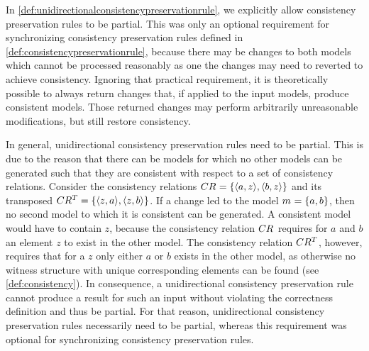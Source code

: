 In \autoref{def:unidirectionalconsistencypreservationrule}, we explicitly allow consistency preservation rules to be partial.
This was only an optional requirement for synchronizing consistency preservation rules defined in \autoref{def:consistencypreservationrule}, because there may be changes to both models which cannot be processed reasonably as one the changes may need to reverted to achieve consistency.
Ignoring that practical requirement, it is theoretically possible to always return changes that, if applied to the input models, produce consistent models.
Those returned changes may perform arbitrarily unreasonable modifications, but still restore consistency.

In general, unidirectional consistency preservation rules need to be partial.
This is due to the reason that there can be models for which no other models can be generated such that they are consistent with respect to a set of consistency relations.
Consider the consistency relations $CR_{} = \{ \langle a, z \rangle, \langle b, z \rangle \}$ and its transposed $CR_{}^T = \{ \langle z, a \rangle, \langle z, b \rangle \}$.
If a change led to the model $m_{} = \{ a, b \}$, then no second model to which it is consistent can be generated.
A consistent model would have to contain $z$, because the consistency relation $CR_{}$ requires for $a$ and $b$ an element $z$ to exist in the other model.
The consistency relation $CR_{}^T$, however, requires that for a $z$ only either $a$ or $b$ exists in the other model, as otherwise no witness structure with unique corresponding elements can be found (see \autoref{def:consistency}).
In consequence, a unidirectional consistency preservation rule cannot produce a result for such an input without violating the correctness definition and thus be partial.
For that reason, unidirectional consistency preservation rules necessarily need to be partial, whereas this requirement was optional for synchronizing consistency preservation rules.

